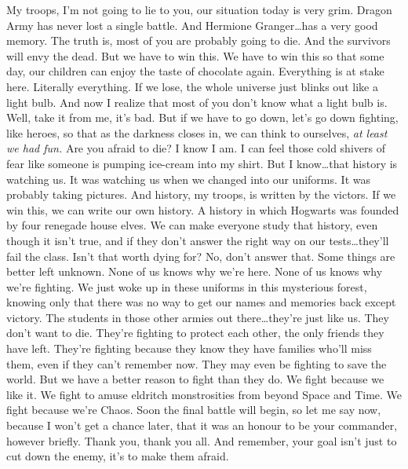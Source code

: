
My troops, I’m not going to lie to you, our situation today is very grim. Dragon Army has never lost a single battle. And Hermione Granger…has a very good memory. The truth is, most of you are probably going to die. And the survivors will envy the dead. But we have to win this. We have to win this so that some day, our children can enjoy the taste of chocolate again. Everything is at stake here. Literally everything. If we lose, the whole universe just blinks out like a light bulb. And now I realize that most of you don’t know what a light bulb is. Well, take it from me, it’s bad. But if we have to go down, let’s go down fighting, like heroes, so that as the darkness closes in, we can think to ourselves, \emph{at least we had fun.} Are you afraid to die? I know I am. I can feel those cold shivers of fear like someone is pumping ice-cream into my shirt. But I know…that history is watching us. It was watching us when we changed into our uniforms. It was probably taking pictures. And history, my troops, is written by the victors. If we win this, we can write our own history. A history in which Hogwarts was founded by four renegade house elves. We can make everyone study that history, even though it isn’t true, and if they don’t answer the right way on our tests…they’ll fail the class. Isn’t that worth dying for? No, don’t answer that. Some things are better left unknown. None of us knows why we’re here. None of us knows why we’re fighting. We just woke up in these uniforms in this mysterious forest, knowing only that there was no way to get our names and memories back except victory. The students in those other armies out there…they’re just like us. They don’t want to die. They’re fighting to protect each other, the only friends they have left. They’re fighting because they know they have families who’ll miss them, even if they can’t remember now. They may even be fighting to save the world. But we have a better reason to fight than they do. We fight because we like it. We fight to amuse eldritch monstrosities from beyond Space and Time. We fight because we’re Chaos. Soon the final battle will begin, so let me say now, because I won’t get a chance later, that it was an honour to be your commander, however briefly. Thank you, thank you all. And remember, your goal isn’t just to cut down the enemy, it’s to make them afraid.

\later

